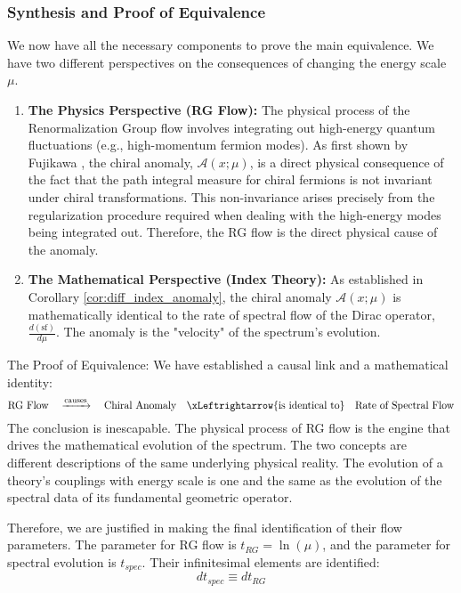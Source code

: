 \documentclass[11pt, letterpaper]{report}
\theoremstyle{plain} %
\theoremstyle{definition} %
\theoremstyle{remark} %
\begin{document}
\subsubsection{Synthesis and Proof of Equivalence}

We now have all the necessary components to prove the main equivalence. We have two different perspectives on the consequences of changing the energy scale $\mu$.

\begin{enumerate}
    \item \textbf{The Physics Perspective (RG Flow):} The physical process of the Renormalization Group flow involves integrating out high-energy quantum fluctuations (e.g., high-momentum fermion modes). As first shown by Fujikawa \cite{Fujikawa1979PathIntegral}, the chiral anomaly, $\mathcal{A}(x; \mu)$, is a direct physical consequence of the fact that the path integral measure for chiral fermions is not invariant under chiral transformations. This non-invariance arises precisely from the regularization procedure required when dealing with the high-energy modes being integrated out. Therefore, the RG flow is the direct physical cause of the anomaly.

    \item \textbf{The Mathematical Perspective (Index Theory):} As established in Corollary \ref{cor:diff_index_anomaly}, the chiral anomaly $\mathcal{A}(x; \mu)$ is mathematically identical to the rate of spectral flow of the Dirac operator, $\frac{d(\text{sf})}{d\mu}$. The anomaly is the "velocity" of the spectrum's evolution.
\end{enumerate}

The Proof of Equivalence: We have established a causal link and a mathematical identity:
$$
\text{RG Flow} \quad \xrightarrow{\text{causes}} \quad \text{Chiral Anomaly} \quad \xLeftrightarrow{\text{is identical to}} \quad \text{Rate of Spectral Flow}
$$
The conclusion is inescapable. The physical process of RG flow is the engine that drives the mathematical evolution of the spectrum. The two concepts are different descriptions of the same underlying physical reality. The evolution of a theory's couplings with energy scale is one and the same as the evolution of the spectral data of its fundamental geometric operator.

Therefore, we are justified in making the final identification of their flow parameters. The parameter for RG flow is $t_{RG} = \ln(\mu)$, and the parameter for spectral evolution is $t_{spec}$. Their infinitesimal elements are identified:
\begin{equation}
    \boxed{dt_{spec} \equiv dt_{RG}}
\end{equation}
\end{document}
